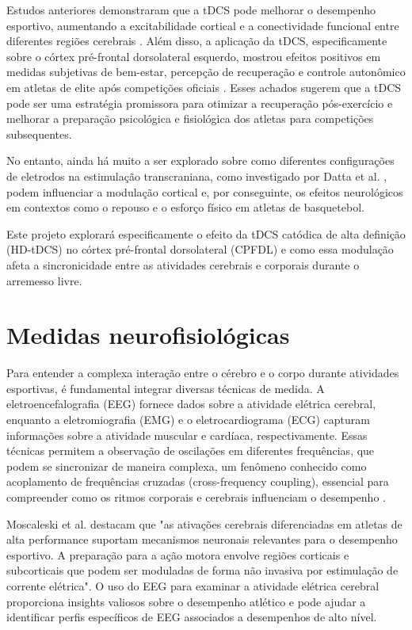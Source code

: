 Estudos anteriores demonstraram que a tDCS pode melhorar o desempenho esportivo, aumentando a excitabilidade cortical e a conectividade funcional entre diferentes regiões cerebrais \cite{okano2015, moreira2021a, moreira2021b}. Além disso, a aplicação da tDCS, especificamente sobre o córtex pré-frontal dorsolateral esquerdo, mostrou efeitos positivos em medidas subjetivas de bem-estar, percepção de recuperação e controle autonômico em atletas de elite após competições oficiais \cite{moreira2021a, moreira2021b}. Esses achados sugerem que a tDCS pode ser uma estratégia promissora para otimizar a recuperação pós-exercício e melhorar a preparação psicológica e fisiológica dos atletas para competições subsequentes.

No entanto, ainda há muito a ser explorado sobre como diferentes configurações de eletrodos na estimulação transcraniana, como investigado por Datta et al. \cite{datta2008}, podem influenciar a modulação cortical e, por conseguinte, os efeitos neurológicos em contextos como o repouso e o esforço físico em atletas de basquetebol.

Este projeto explorará especificamente o efeito da tDCS catódica de alta definição (HD-tDCS) no córtex pré-frontal dorsolateral (CPFDL) e como essa modulação afeta a sincronicidade entre as atividades cerebrais e corporais durante o arremesso livre.

\section{Medidas neurofisiológicas}
Para entender a complexa interação entre o cérebro e o corpo durante atividades esportivas, é fundamental integrar diversas técnicas de medida. A eletroencefalografia (EEG) fornece dados sobre a atividade elétrica cerebral, enquanto a eletromiografia (EMG) e o eletrocardiograma (ECG) capturam informações sobre a atividade muscular e cardíaca, respectivamente. Essas técnicas permitem a observação de oscilações em diferentes frequências, que podem se sincronizar de maneira complexa, um fenômeno conhecido como acoplamento de frequências cruzadas (cross-frequency coupling), essencial para compreender como os ritmos corporais e cerebrais influenciam o desempenho \cite{criscuolo2022}.

Moscaleski et al. \cite{moscaleski2022} destacam que "as ativações cerebrais diferenciadas em atletas de alta performance suportam mecanismos neuronais relevantes para o desempenho esportivo. A preparação para a ação motora envolve regiões corticais e subcorticais que podem ser moduladas de forma não invasiva por estimulação de corrente elétrica". O uso do EEG para examinar a atividade elétrica cerebral proporciona insights valiosos sobre o desempenho atlético e pode ajudar a identificar perfis específicos de EEG associados a desempenhos de alto nível.

